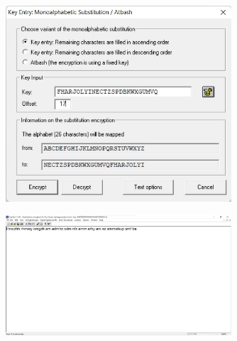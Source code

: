 \documentclass{article}
\begin{document}
\begin{figure}[H]
    \centering
    \includegraphics[width=0.75\textwidth]{figures/2b.jpg}
    \caption
	{}
    \label{fig:fig1}
\end{figure}

\begin{figure}[H]
    \centering
    \includegraphics[width=0.75\textwidth]{figures/2c.jpg}
    \caption
	{}
    \label{fig:fig1}
\end{figure}


\section{}%
\end{document}
